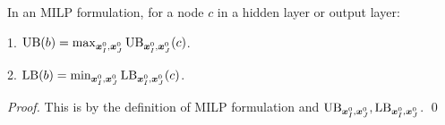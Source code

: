 			\begin{lemma} In an MILP formulation, for a node $c$ in a hidden layer or output layer:
				
				1. $\mathrm{UB}(b)=\max_{\boldsymbol{x}^0_I,\boldsymbol{x}^0_J}\mathrm{UB}_{\boldsymbol{x}^0_I,\boldsymbol{x}^0_J}(c)$. 
				
				2. $\mathrm{LB}(b)=\min_{\boldsymbol{x}^0_I,\boldsymbol{x}^0_J}\mathrm{LB}_{\boldsymbol{x}^0_I,\boldsymbol{x}^0_J}(c)$. 
			\end{lemma}
			
			\begin{proof}
				This is by the definition of MILP formulation and $\mathrm{UB}_{\boldsymbol{x}^0_I,\boldsymbol{x}^0_J}, \mathrm{LB}_{\boldsymbol{x}^0_I,\boldsymbol{x}^0_J}$. \qed
			\end{proof}
			
			
